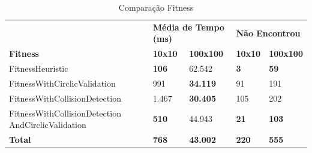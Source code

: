 \begin{table}[]
	\centering
	\caption{Comparação Fitness}
	\label{my-label}
	\begin{tabular}{lllll}
		\textbf{}                                         & \multicolumn{2}{l}{\textbf{Média de Tempo (ms)}}             & \multicolumn{2}{l}{\textbf{Não Encontrou}}               \\
		\textbf{Fitness}                                  & \textbf{10x10}              & \textbf{100x100}               & \textbf{10x10}             & \textbf{100x100}            \\
		FitnessHeuristic                                  & \textbf{106} & 62.542                         & \textbf{3}  & \textbf{59}  \\
		FitnessWithCirclicValidation                      & 991                         & \textbf{34.119} & 91                         & 191                         \\
		FitnessWithCollisionDetection                     & 1.467                       & \textbf{30.405} & 105                        & 202                         \\
		FitnessWithCollisionDetection
		AndCirclicValidation & \textbf{510} & 44.943                         & \textbf{21} & \textbf{103} \\
		\textbf{Total}                                    & \textbf{768}                & \textbf{43.002}                & \textbf{220}               & \textbf{555}               
	\end{tabular}
\end{table}


